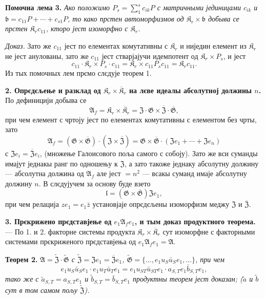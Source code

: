 \documentclass[11pt]{article}
\begin{document}
\noindent\textbf{Помочна лема 3.} \emph{Ако положимо \(P_s=\sum_1^s c_{ik}P\) с матричными јединицами \(c_{ik}\) и \(\mathfrak b=c_{11}P+\cdots+c_{s1}P\), то како прстен автоморфизмов од \(\mathfrak K_r\times\mathfrak b\) добыва се прстен \(\mathfrak K_rc_{11}\), кторо јест изоморфно с \(\mathfrak K_r\).}

\noindent\emph{Доказ.} Зато же \(c_{11}\) јест по елементах комутативны с \(\mathfrak K_r\) и ниједин елемент из \(\mathfrak K_r\) не јест анулованы, зато же \(c_{11}\) јест стварјајучи идемпотент од \(\mathfrak K_r\times P_s\), и јест
\[
c_{11}\cdot\mathfrak K_r\times P_s\cdot c_{11}
=\mathfrak K_r\times c_{11}P_sc_{11}
=\mathfrak K_rc_{11}.
\]
Из тых помочных лем прємо слєдује теорем 1.

\noindent\textbf{2. Опрєдєљење и разклад од \(\mathfrak K_r\times\overline{\mathfrak K}_r\) на лєве идеалы абсолутној должины \(n\).} По дефиницији добыва се
\[
\mathfrak A_f=\mathfrak K_r\times\overline{\mathfrak K}_r
=\mathfrak Z\cdot\mathfrak G\times\overline{\mathfrak Z}\cdot\overline{\mathfrak G},
\]
при чем елемент с чртоју јест по елементах комутативны с елементом без чрты, зато
\[
\mathfrak A_f
=(\mathfrak G\times\overline{\mathfrak G})\cdot(\mathfrak Z\times\overline{\mathfrak Z})
=\mathfrak G\times\overline{\mathfrak G}\cdot(\mathfrak Ze_1+\cdots+\mathfrak Ze_n)
\]
с \(\mathfrak Ze_i=\overline{\mathfrak Z}e_i\), (множење Галоисового поља самого с собоју). Зато же вси суманды имајут једнакы ранг по одношењу к \(\mathfrak Z\), а зато такоже једнаку абсолутну должину --- абсолутна должина од \(\mathfrak A_f\) але јест \(=n^2\) --- всакы суманд имаје абсолутну должину \(n\). В слєдујучем за основу буде взето
\[
\mathfrak l=(\mathfrak G\times\overline{\mathfrak G})\mathfrak Ze_1,
\]
при чем релација \(ze_1=e_1\bar z\) установјаје опрєдєљены изоморфизм меджу \(\mathfrak Z\) и \(\overline{\mathfrak Z}\).

\noindent\textbf{3. Прєкрижено прєдставјење од \(e_1\mathfrak A_fe_1\), и тым доказ продуктного теорема.} --- По 1. и 2. факторне системы продукта \(\mathfrak K_r\times\overline{\mathfrak K}_r\) сут изоморфне с факторными системами прєкриженого прєдставјења од \(e_1\mathfrak A_fe_1=\mathfrak A\).

\noindent\textbf{Теорем 2.} \emph{\(\mathfrak A=\widetilde{\mathfrak Z}\cdot\widetilde{\mathfrak G}\) с \(\widetilde{\mathfrak Z}=\mathfrak Ze_1=\overline{\mathfrak Z}e_1\), \(\widetilde{\mathfrak G}=\{\ldots,e_1u_S\bar u_Se_1,\ldots\}\), при чем
\[
e_1u_S\bar u_Se_1\cdot e_1u_T\bar u_Te_1
=e_1u_{ST}\bar u_{ST}e_1\cdot a_{S,T}e_1\bar b_{S,T}e_1,
\]
тако же с \(\tilde a_{S,T}=a_{S,T}e_1\) и \(\tilde b_{S,T}=\bar b_{S,T}e_1\) продуктны теорем јест доказан; (\(\tilde a\) и \(\tilde b\) сут в том самом пољу \(\widetilde{\mathfrak Z}\)).}
\end{document}

